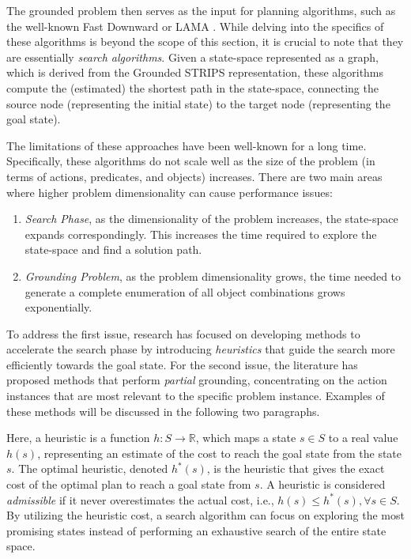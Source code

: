 The grounded problem then serves as the input for planning algorithms, such as the well-known Fast Downward \cite{helmert2006fast} or LAMA \cite{richter2010lama}. While delving into the specifics of these algorithms is beyond the scope of this section, it is crucial to note that they are essentially \textit{search algorithms}. Given a state-space represented as a graph, which is derived from the Grounded STRIPS representation, these algorithms compute the (estimated) the shortest path in the state-space, connecting the source node (representing the initial state) to the target node (representing the goal state).

The limitations of these approaches have been well-known for a long time. Specifically, these algorithms do not scale well as the size of the problem (in terms of actions, predicates, and objects) increases. There are two main areas where higher problem dimensionality can cause performance issues:

\begin{enumerate}
    \item \textit{Search Phase}, as the dimensionality of the problem increases, the state-space expands correspondingly. This increases the time required to explore the state-space and find a solution path.
    \item \textit{Grounding Problem}, as the problem dimensionality grows, the time needed to generate a complete enumeration of all object combinations grows exponentially.
\end{enumerate}

To address the first issue, research has focused on developing methods to accelerate the search phase by introducing \textit{heuristics} that guide the search more efficiently towards the goal state. For the second issue, the literature has proposed methods that perform \textit{partial} grounding, concentrating on the action instances that are most relevant to the specific problem instance. Examples of these methods will be discussed in the following two paragraphs.

Here, a heuristic is a function $h: S \rightarrow \mathbb{R}$, which maps a state $s \in S$ to a real value $h(s)$, representing an estimate of the cost to reach the goal state from the state $s$. The optimal heuristic, denoted $h^{*}(s)$, is the heuristic that gives the exact cost of the optimal plan to reach a goal state from $s$. A heuristic is considered \textit{admissible} if it never overestimates the actual cost, i.e., $h(s) \leq h^{*}(s), \forall s \in S$. By utilizing the heuristic cost, a search algorithm can focus on exploring the most promising states instead of performing an exhaustive search of the entire state space.

